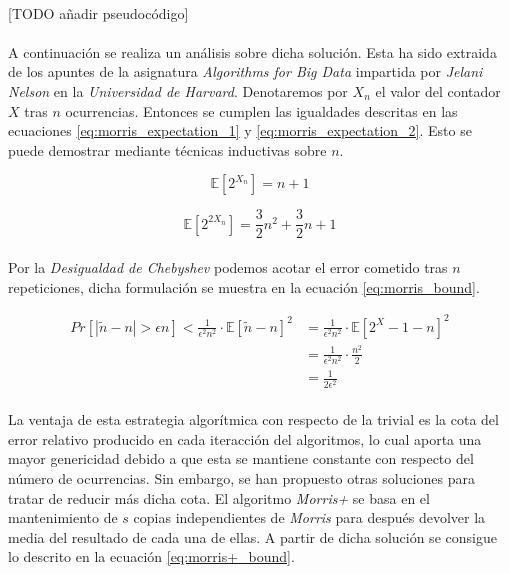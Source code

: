 \documentclass{subfiles}
\begin{document}
      \paragraph{}
      [TODO añadir pseudocódigo]

      \paragraph{}
      A continuación se realiza un análisis sobre dicha solución. Esta ha sido extraida de los apuntes de la asignatura \emph{Algorithms for Big Data} \cite{bigdata2015jelani} impartida por \emph{Jelani Nelson} en la \emph{Universidad de Harvard}. Denotaremos por $X_n$ el valor del contador $X$ tras $n$ ocurrencias. Entonces se cumplen las igualdades descritas en las ecuaciones \eqref{eq:morris_expectation_1} y \eqref{eq:morris_expectation_2}. Esto se puede demostrar mediante técnicas inductivas sobre $n$.

      \begin{equation}
      \label{eq:morris_expectation_1}
        \mathbb{E}[2^{X_n}] = n + 1
      \end{equation}

      \begin{equation}
      \label{eq:morris_expectation_2}
        \mathbb{E}[2^{2X_n}] = \frac{3}{2}n^2 + \frac{3}{2}n + 1
      \end{equation}

      \paragraph{}
      Por la \emph{Desigualdad de Chebyshev} podemos acotar el error cometido tras $n$ repeticiones, dicha formulación se muestra en la ecuación \eqref{eq:morris_bound}.

      \begin{align}
      \label{eq:morris_bound}
        Pr[|\widetilde{n} - n| > \epsilon n ] < \frac{1}{\epsilon^2n^2}\cdot\mathbb{E}[\widetilde{n} - n]^2
          &= \frac{1}{\epsilon^2n^2}\cdot\mathbb{E}[2^X-1-n]^2
        \\&= \frac{1}{\epsilon^2n^2}\cdot \frac{n^2}{2}
        \\&= \frac{1}{2\epsilon^2}
      \end{align}

      \paragraph{}
      La ventaja de esta estrategia algorítmica con respecto de la trivial es la cota del error relativo producido en cada iteracción del algoritmos, lo cual aporta una mayor genericidad debido a que esta se mantiene constante con respecto del número de ocurrencias. Sin embargo, se han propuesto otras soluciones para tratar de reducir más dicha cota. El algoritmo \emph{Morris+} se basa en el mantenimiento de $s$ copias independientes de \emph{Morris} para después devolver la media del resultado de cada una de ellas. A partir de dicha solución se consigue lo descrito en la ecuación \eqref{eq:morris+_bound}.
\end{document}
